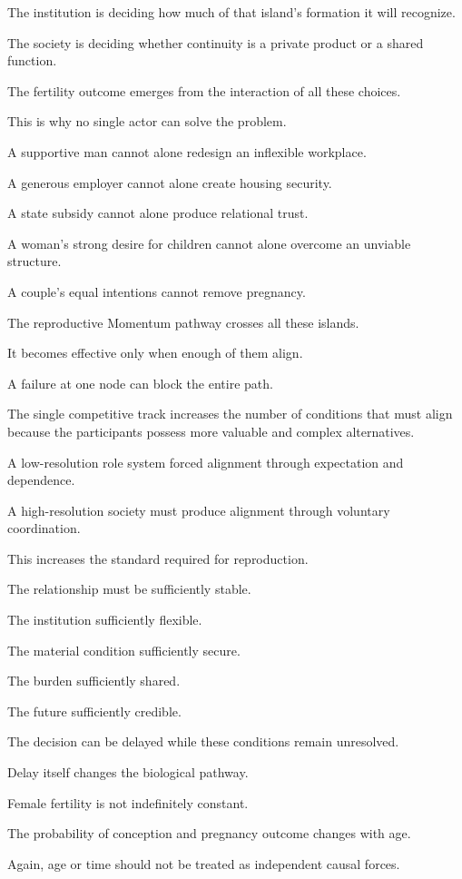 The institution is deciding how much of that island’s formation it will recognize.

The society is deciding whether continuity is a private product or a shared function.

The fertility outcome emerges from the interaction of all these choices.

This is why no single actor can solve the problem.

A supportive man cannot alone redesign an inflexible workplace.

A generous employer cannot alone create housing security.

A state subsidy cannot alone produce relational trust.

A woman’s strong desire for children cannot alone overcome an unviable structure.

A couple’s equal intentions cannot remove pregnancy.

The reproductive Momentum pathway crosses all these islands.

It becomes effective only when enough of them align.

A failure at one node can block the entire path.

The single competitive track increases the number of conditions that must align because the participants possess more valuable and complex alternatives.

A low-resolution role system forced alignment through expectation and dependence.

A high-resolution society must produce alignment through voluntary coordination.

This increases the standard required for reproduction.

The relationship must be sufficiently stable.

The institution sufficiently flexible.

The material condition sufficiently secure.

The burden sufficiently shared.

The future sufficiently credible.

The decision can be delayed while these conditions remain unresolved.

Delay itself changes the biological pathway.

Female fertility is not indefinitely constant.

The probability of conception and pregnancy outcome changes with age.

Again, age or time should not be treated as independent causal forces.

